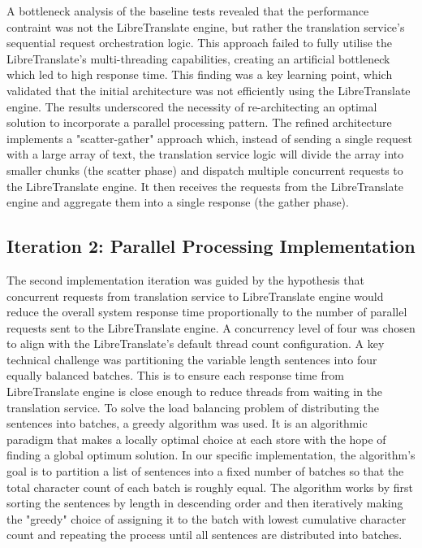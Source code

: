 A bottleneck analysis of the baseline tests revealed that the performance contraint was not the LibreTranslate engine, but rather the translation service's sequential request orchestration logic. This approach failed to fully utilise the LibreTranslate's multi-threading capabilities, creating an artificial bottleneck which led to high response time. This finding was a key learning point, which validated that the initial architecture was not efficiently using the LibreTranslate engine. The results underscored the necessity of re-architecting an optimal solution to incorporate a parallel processing pattern\cite{kleppmann2017designing}. The refined architecture implements a "scatter-gather" approach which, instead of sending a single request with a large array of text, the translation service logic will divide the array into smaller chunks (the scatter phase) and dispatch multiple concurrent requests to the LibreTranslate engine. It then receives the requests from the LibreTranslate engine and aggregate them into a single response (the gather phase).

\subsection{Iteration 2: Parallel Processing Implementation}

The second implementation iteration was guided by the hypothesis that concurrent requests from translation service to LibreTranslate engine would reduce the overall system response time proportionally to the number of parallel requests sent to the LibreTranslate engine. A concurrency level of four was chosen to align with the LibreTranslate's default thread count configuration\cite{libretranslate_docs_installation}. A key technical challenge was partitioning the variable length sentences into four equally balanced batches. This is to ensure each response time from LibreTranslate engine is close enough to reduce threads from waiting in the translation service.  To solve the load balancing problem of distributing the sentences into batches, a greedy algorithm was used. It is an algorithmic paradigm that makes a locally optimal choice at each store with the hope of finding a global optimum solution\cite{geeksforgeeks_greedy, kleinberg2006algorithm, wiki:greedy_partitioning}. In our specific implementation, the algorithm's goal is to partition a list of sentences into a fixed number of batches so that the total character count of each batch is roughly equal. The 
algorithm works by first sorting the sentences by length in descending order and then iteratively making the "greedy" choice of assigning it to the batch with lowest cumulative character count and repeating the process until all sentences are distributed into batches.

